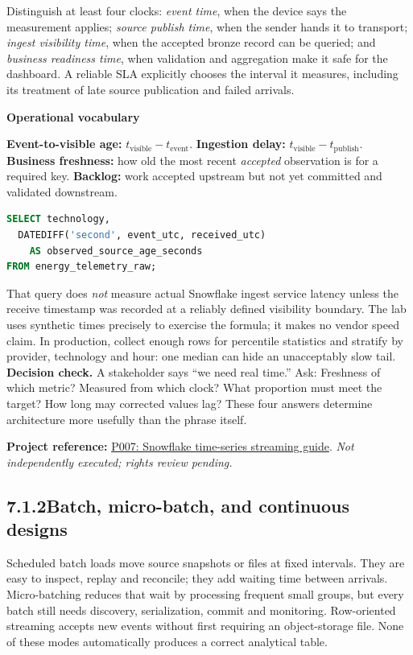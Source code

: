 \documentclass[11pt,twoside]{article}
\newcommand{\topic}[2]{\subsection*{#1\quad #2}}
\newcommand{\repo}[2]{\par\begingroup\fontsize{8.0}{9.6}\selectfont\sffamily\color{inkgray}\textbf{Project reference:} \href{#2}{#1}. \textit{Not independently executed; rights review pending.}\par\endgroup}
\begin{document}
Distinguish at least four clocks: \emph{event time}, when the device says the measurement applies; \emph{source publish time}, when the sender hands it to transport; \emph{ingest visibility time}, when the accepted bronze record can be queried; and \emph{business readiness time}, when validation and aggregation make it safe for the dashboard. A reliable SLA explicitly chooses the interval it measures, including its treatment of late source publication and failed arrivals.
\begin{whitebox}\textbf{Operational vocabulary}\par
\textbf{Event-to-visible age:} \(t_{\mathrm{visible}}-t_{\mathrm{event}}\). \textbf{Ingestion delay:} \(t_{\mathrm{visible}}-t_{\mathrm{publish}}\). \textbf{Business freshness:} how old the most recent \emph{accepted} observation is for a required key. \textbf{Backlog:} work accepted upstream but not yet committed and validated downstream.\end{whitebox}
\begin{lstlisting}[language=SQL,caption={Measure received-to-event age when both UTC timestamps are recorded.}]
SELECT technology,
  DATEDIFF('second', event_utc, received_utc)
    AS observed_source_age_seconds
FROM energy_telemetry_raw;
\end{lstlisting}
That query does \emph{not} measure actual Snowflake ingest service latency unless the receive timestamp was recorded at a reliably defined visibility boundary. The lab uses synthetic times precisely to exercise the formula; it makes no vendor speed claim. In production, collect enough rows for percentile statistics and stratify by provider, technology and hour: one median can hide an unacceptably slow tail.
\textbf{Decision check.} A stakeholder says ``we need real time.'' Ask: Freshness of which metric? Measured from which clock? What proportion must meet the target? How long may corrected values lag? These four answers determine architecture more usefully than the phrase itself.
\repo{P007: Snowflake time-series streaming guide}{https://github.com/Snowflake-Labs/sfguide-getting-started-with-time-series-using-snowflake-streaming-sis-ml-notebooks}
\newpage
\topic{7.1.2}{Batch, micro-batch, and continuous designs}
Scheduled batch loads move source snapshots or files at fixed intervals. They are easy to inspect, replay and reconcile; they add waiting time between arrivals. Micro-batching reduces that wait by processing frequent small groups, but every batch still needs discovery, serialization, commit and monitoring. Row-oriented streaming accepts new events without first requiring an object-storage file. None of these modes automatically produces a correct analytical table.
\end{document}

